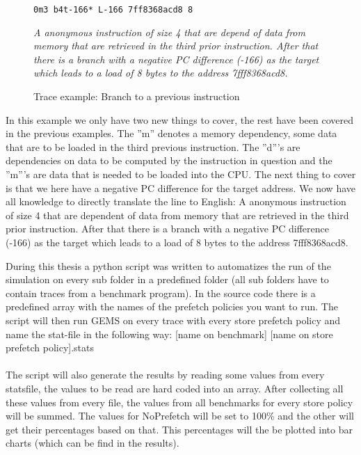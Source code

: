 \begin{figure}[h]
\begin{lstlisting}[frame=single]  
0m3 b4t-166* L-166 7ff8368acd8 8
\end{lstlisting}
\centering
\emph{A anonymous instruction of size 4 that are depend of data from memory
that are retrieved in the third prior instruction. After that there is a branch with a
negative PC difference (-166) as the target which leads to a load of 8 bytes to the
address 7fff8368acd8.}
  \caption{Trace example: Branch to a previous instruction}
\end{figure}

In this example we only have two new things to cover, the rest have been covered
in the previous examples. The ”m” denotes a memory dependency, some data that
are to be loaded in the third previous instruction. The ”d”’s are dependencies on
data to be computed by the instruction in question and the ”m”’s are data that is
needed to be loaded into the CPU. The next thing to cover is that we here have a
negative PC difference for the target address. We now have all knowledge to directly
translate the line to English: A anonymous instruction of size 4 that are dependent of
data from memory that are retrieved in the third prior instruction. After that there
is a branch with a negative PC difference (-166) as the target which leads to a load
of 8 bytes to the address 7fff8368acd8.

During this thesis a python script was written to automatizes the run of the simulation
on every sub folder in a predefined folder (all sub folders have to contain traces
from a benchmark program). In the source code there is a predefined array with the
names of the prefetch policies you want to run. The script will then run GEMS on
every trace with every store prefetch policy and name the stat-file in the following
way: [name on benchmark] [name on store prefetch policy].stats
 \\ \\
The script will also generate the results by reading some values from every statsfile,
the values to be read are hard coded into an array. After collecting all these
values from every file, the values from all benchmarks for every store policy will be
summed. The values for NoPrefetch will be set to 100\% and the other will get their
percentages based on that. This percentages will the be plotted into bar charts (which
can be find in the results).

